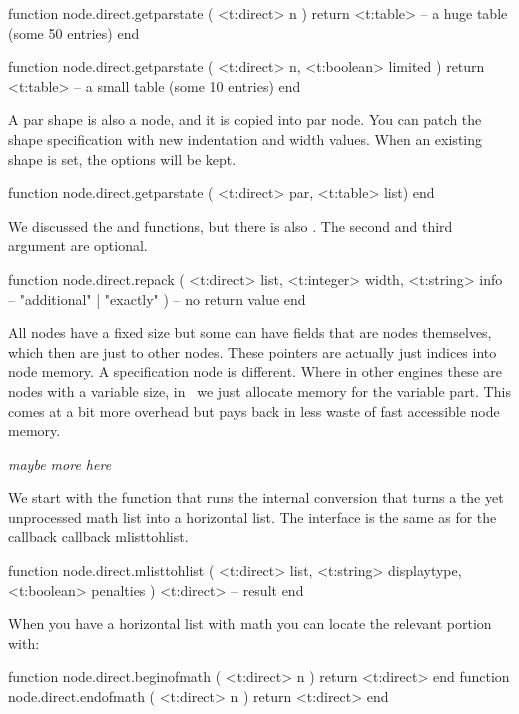 \starttyping[option=LUA]
function node.direct.getparstate (
    <t:direct> n
)
    return <t:table> -- a huge table (some 50 entries)
end

function node.direct.getparstate (
    <t:direct>  n,
    <t:boolean> limited
)
    return <t:table> -- a small table (some 10 entries)
end
\stoptyping

A par shape is also a node, and it is copied into par node. You can patch the
shape specification with new indentation and width values. When an existing shape
is set, the options will be kept.

\starttyping[option=LUA]
function node.direct.getparstate ( <t:direct> par, <t:table> list) end
\stoptyping

We discussed the  and  functions, but there is also
. The second and third argument are optional.

\starttyping[option=LUA]
function node.direct.repack (
    <t:direct>  list,
    <t:integer> width,
    <t:string>  info -- "additional" | "exactly"
)
    -- no return value
end
\stoptyping

\stopsubsection

\startsubsection[title={Specifications}]

All nodes have a fixed size but some can have fields that are nodes themselves,
which then are just  to other nodes. These pointers are actually
just indices into node memory. A specification node is different. Where in other
engines these are nodes with a variable size, in \LUAMETATEX\ we just allocate
memory for the variable part. This comes at a bit more overhead but pays back in
less waste of fast accessible node memory.

{\em maybe more here}

\stopsubsection

\startsubsection[title={Math}]

We start with the function that runs the internal 
conversion that turns a the yet unprocessed math list into a horizontal list. The
interface is the same as for the callback callback {mlisttohlist}.

\starttyping[option=LUA]
function node.direct.mlisttohlist (
    <t:direct>  list,
    <t:string>  displaytype,
    <t:boolean> penalties
)
   <t:direct> -- result
end
\stoptyping

When you have a horizontal list with math you can locate the relevant portion
with:

\starttyping[option=LUA]
function node.direct.beginofmath ( <t:direct> n ) return <t:direct> end
function node.direct.endofmath   ( <t:direct> n ) return <t:direct> end
\stoptyping

